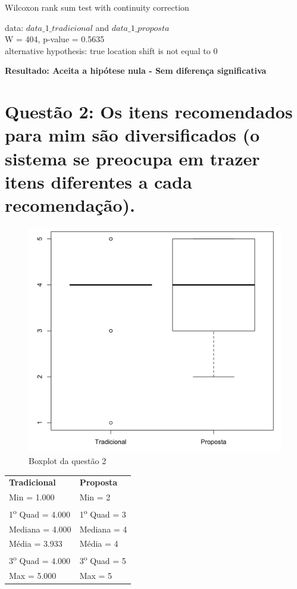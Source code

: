 Wilcoxon rank sum test with continuity correction

\noindent
data:  $data\_1\_tradicional$ and $data\_1\_proposta$\\
W = 404, p-value = 0.5635\\
alternative hypothesis: true location shift is not equal to 0

\noindent
\textbf{Resultado: Aceita a hipótese nula - Sem diferença significativa}

\newpage
\section{Questão 2: Os itens recomendados para mim são diversificados (o sistema se preocupa em trazer itens diferentes a cada recomendação).}

\begin{figure}[htb]
  \caption{\label{fig:questao2-boxplot}Boxplot da questão 2}
  \begin{center}
      \includegraphics[scale=0.4]{./Figuras/questao2-boxplot.png}
  \end{center}
\end{figure}

\begin{table}[h]
\begin{tabular}{p{}p{}}
\textbf{Tradicional} & \textbf{Proposta} \\
Min = 1.000 & Min = 2\\
1\textsuperscript{o} Quad = 4.000 & 1\textsuperscript{o} Quad = 3\\
Mediana = 4.000 & Mediana = 4\\
Média = 3.933 & Média = 4\\
3\textsuperscript{o} Quad = 4.000 & 3\textsuperscript{o} Quad = 5\\
Max = 5.000 & Max = 5\\
\end{tabular}
\end{table}

